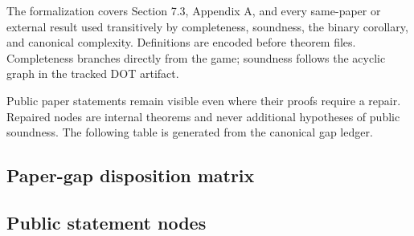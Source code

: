 
The formalization covers Section 7.3, Appendix A, and every same-paper or
external result used transitively by completeness, soundness, the binary
corollary, and canonical complexity. Definitions are encoded before theorem
files. Completeness branches directly from the game; soundness follows the
acyclic graph in the tracked DOT artifact.

Public paper statements remain visible even where their proofs require a
repair. Repaired nodes are internal theorems and never additional hypotheses
of public soundness. The following table is generated from the canonical gap
ledger.

\subsection{Paper-gap disposition matrix}


\subsection{Public statement nodes}

